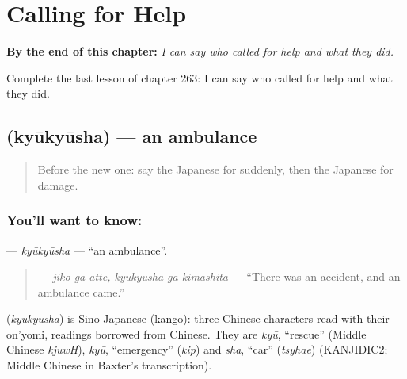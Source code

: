 
\chapter{Calling for Help}
\label{ch:ja-calling-for-help}

\begin{chapteropening}
\textbf{By the end of this chapter:} \emph{I can say who called for help and what they did.}

Complete the last lesson of chapter 263: I can say who called for help and what they did.
\end{chapteropening}

\section[\texorpdfstring{\ja{きゅうきゅうしゃ} (kyūkyūsha)}{きゅうきゅうしゃ (kyūkyūsha)}]{ (kyūkyūsha) — an ambulance}

\label{lesson:JA-C263-kyuukyuusha}



\begin{quote}
Before the new one: say the Japanese for suddenly, then the Japanese for damage.
\end{quote}

\subsection*{You'll want to know: }
\textbf{} — \emph{kyūkyūsha} — \textquotedblleft{}an ambulance\textquotedblright{}.

\begin{quote}
\textbf{  } — \emph{jiko ga atte, kyūkyūsha ga kimashita} — \textquotedblleft{}There was an accident, and an ambulance came.\textquotedblright{}
\end{quote}

\begin{cousinweb}
\textbf{} (\emph{kyūkyūsha}) is Sino-Japanese (kango): three Chinese characters read with their on'yomi, readings borrowed from Chinese. They are \emph{kyū}, \textquotedblleft{}rescue\textquotedblright{} (Middle Chinese \emph{kjuwH}), \emph{kyū}, \textquotedblleft{}emergency\textquotedblright{} (\emph{kip}) and \emph{sha}, \textquotedblleft{}car\textquotedblright{} (\emph{tsyhae}) (KANJIDIC2; Middle Chinese in Baxter's transcription).
\end{cousinweb}

